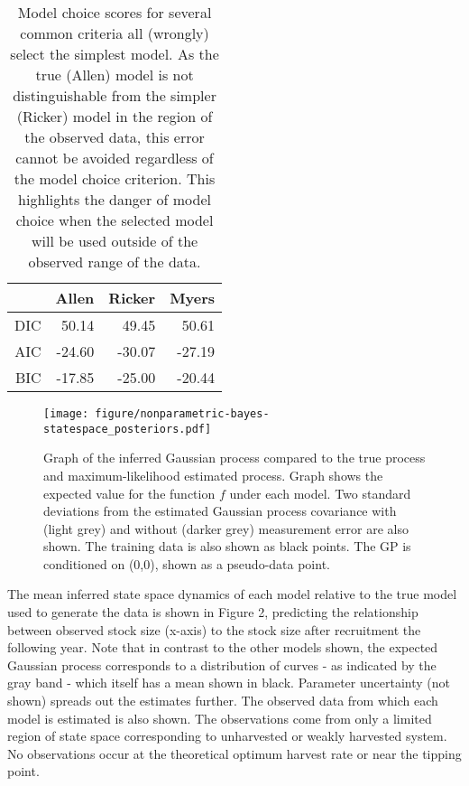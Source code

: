 \documentclass[author-year, review]{elsarticle} %
\makeatletter
\def\maxwidth{\ifdim\Gin@nat@width>\linewidth\linewidth
\else\Gin@nat@width\fi}
\let\Oldincludegraphics\includegraphics
\renewcommand{\includegraphics}[1]{\Oldincludegraphics[width=\maxwidth]{#1}}
\makeatother
\begin{document}
\begin{table}[ht]
\begin{center}
\begin{tabular}{rrrr}
  \hline
 & Allen & Ricker & Myers \\ 
  \hline
DIC & 50.14 & 49.45 & 50.61 \\ 
  AIC & -24.60 & -30.07 & -27.19 \\ 
  BIC & -17.85 & -25.00 & -20.44 \\ 
   \hline
\end{tabular}
\caption{Model choice scores for several common criteria all (wrongly) select the simplest model. As the true (Allen) model is not distinguishable from the simpler (Ricker) model in the region of the observed data, this error cannot be avoided regardless of the model choice criterion. This highlights the danger of model choice when the selected model will be used outside of the observed range of the data.}
\end{center}
\end{table}

\begin{figure}[htbp]
\centering
\texttt{[image: figure/nonparametric-bayes-statespace\_posteriors.pdf]}
\caption{Graph of the inferred Gaussian process compared to the true
process and maximum-likelihood estimated process. Graph shows the
expected value for the function $f$ under each model. Two standard
deviations from the estimated Gaussian process covariance with (light
grey) and without (darker grey) measurement error are also shown. The
training data is also shown as black points. The GP is conditioned on
(0,0), shown as a pseudo-data point.}
\end{figure}

The mean inferred state space dynamics of each model relative to the
true model used to generate the data is shown in Figure 2, predicting
the relationship between observed stock size (x-axis) to the stock size
after recruitment the following year. Note that in contrast to the other
models shown, the expected Gaussian process corresponds to a
distribution of curves - as indicated by the gray band - which itself
has a mean shown in black. Parameter uncertainty (not shown) spreads out
the estimates further. The observed data from which each model is
estimated is also shown. The observations come from only a limited
region of state space corresponding to unharvested or weakly harvested
system. No observations occur at the theoretical optimum harvest rate or
near the tipping point.
\end{document}
